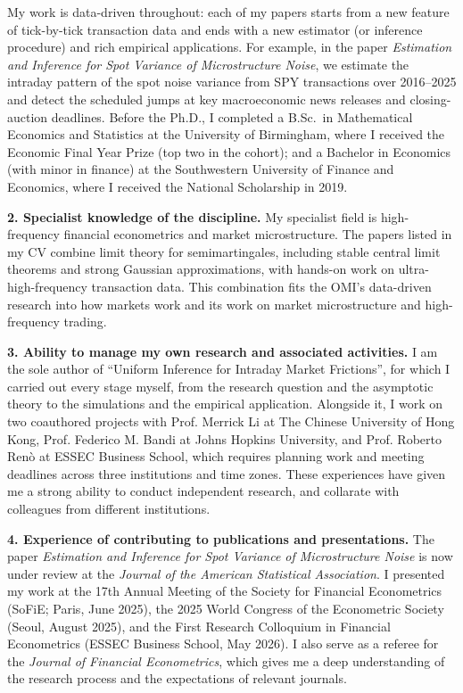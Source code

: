 \documentclass[12pt,a4paper]{article}
\begin{document}
My work is data-driven throughout: 
each of my papers starts from a new feature of
tick-by-tick transaction data and ends with a new estimator (or inference procedure) 
and rich empirical applications. 
For example, 
in the paper \textit{Estimation and Inference for Spot Variance of Microstructure Noise}, 
we estimate the intraday pattern of the spot noise variance 
from SPY transactions over 2016--2025 
and detect the scheduled jumps at key macroeconomic news releases 
and closing-auction deadlines. 
Before the Ph.D., I completed a B.Sc.\ in Mathematical Economics and Statistics
at the University of Birmingham, where I received the Economic Final Year Prize
(top two in the cohort); and a Bachelor in Economics (with minor in finance) 
at the Southwestern University of Finance and Economics, 
where I received the National Scholarship in 2019. 

\textbf{2. Specialist knowledge of the discipline.}
My specialist field is high-frequency financial econometrics and market microstructure.
The papers listed in my CV combine limit theory for semimartingales,
including stable central limit theorems and strong Gaussian approximations,
with hands-on work on ultra-high-frequency transaction data.
This combination fits the OMI's data-driven research into how markets work
and its work on market microstructure and high-frequency trading.

\textbf{3. Ability to manage my own research and associated activities.}
I am the sole author of ``Uniform Inference for Intraday Market Frictions'',
for which I carried out every stage myself, from the research question and the asymptotic theory
to the simulations and the empirical application.
Alongside it, I work on two coauthored projects with 
Prof. Merrick Li at The Chinese University of Hong Kong, 
Prof. Federico M. Bandi at Johns Hopkins University, 
and Prof. Roberto Ren\`o at ESSEC Business School,
which requires planning work and meeting deadlines 
across three institutions and time zones.
These experiences have given me a strong ability to conduct independent research, 
and collarate with colleagues from different institutions.

\textbf{4. Experience of contributing to publications and presentations.} 
The paper \textit{Estimation and Inference for Spot Variance of Microstructure Noise}
is now 
under review at the \textit{Journal of the American Statistical Association}.
I presented my work at the 17th Annual Meeting of the Society for Financial Econometrics
(SoFiE; Paris, June 2025), 
the 2025 World Congress of the Econometric Society (Seoul, August 2025),
and the 
First Research Colloquium in Financial Econometrics (ESSEC Business School, May 2026). 
I also serve as a referee for the \textit{Journal of Financial Econometrics}, 
which gives me a deep understanding of the research process 
and the expectations of relevant journals.
\end{document}
